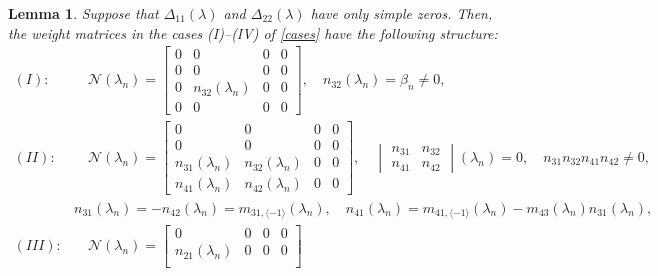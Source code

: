 \documentclass[a4paper,12pt]{article}
\newcommand{\be}{\beta}
\newcommand{\la}{\lambda}
\theoremstyle{plain}
\numberwithin{equation}{section}
\newtheorem{lem}[thm]{Lemma}
\theoremstyle{definition}
\theoremstyle{remark}
\begin{document}
\begin{lem} \label{lem:weight}
Suppose that $\Delta_{11}(\la)$ and $\Delta_{22}(\la)$ have only simple zeros. Then, the weight matrices in the cases (I)--(IV) of \eqref{cases} have the following structure:
\begin{align} \nonumber
(I) \colon & \quad \mathcal N(\la_n) = \begin{bmatrix}
                                            0 & 0 & 0 & 0 \\
                                            0 & 0 & 0 & 0 \\
                                            0 & n_{32}(\la_n) & 0 & 0 \\
                                            0 & 0 & 0 & 0 
                                       \end{bmatrix}, \quad n_{32}(\la_n) = \be_n \ne 0, \\ \nonumber
(II) \colon & \quad \mathcal N(\la_n) = \begin{bmatrix}
                                            0 & 0 & 0 & 0 \\
                                            0 & 0 & 0 & 0 \\
                                            n_{31}(\la_n) & n_{32}(\la_n) & 0 & 0 \\
                                            n_{41}(\la_n) & n_{42}(\la_n) & 0 & 0 
                                        \end{bmatrix}, \quad
                                        \begin{vmatrix}
                                            n_{31} & n_{32} \\
                                            n_{41} & n_{42}
                                        \end{vmatrix}(\la_n) = 0, 
                                        \quad n_{31} n_{32} n_{41} n_{42} \ne 0, \\ \label{rel2}
                                        & 
                                        n_{31}(\la_n) = -n_{42}(\la_n) = m_{31,\langle -1 \rangle}(\la_n), \quad
                                        n_{41}(\la_n) = m_{41,\langle-1\rangle}(\la_n) - m_{43}(\la_n) n_{31}(\la_n), \\ \nonumber
(III) \colon & \quad \mathcal N(\la_n) = \begin{bmatrix}
                                            0 & 0 & 0 & 0 \\
                                            n_{21}(\la_n) & 0 & 0 & 0 \\

\end{bmatrix}
\end{align}
\end{lem}
\end{document}
